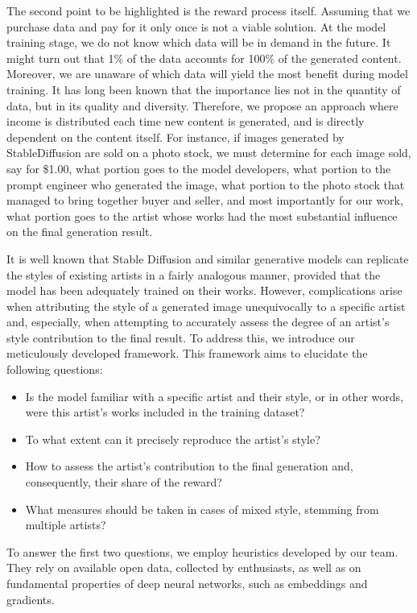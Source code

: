 \documentclass[12pt, letterpaper]{article}
\begin{document}
The second point to be highlighted is the reward process itself. Assuming that we purchase data and pay for it only once is not a viable solution. At the model training stage, we do not know which data will be in demand in the future. It might turn out that 1\% of the data accounts for 100\% of the generated content. Moreover, we are unaware of which data will yield the most benefit during model training. It has long been known that the importance lies not in the quantity of data, but in its quality and diversity. Therefore, we propose an approach where income is distributed each time new content is generated, and is directly dependent on the content itself. For instance, if images generated by StableDiffusion are sold on a photo stock, we must determine for each image sold, say for \$1.00, what portion goes to the model developers, what portion to the prompt engineer who generated the image, what portion to the photo stock that managed to bring together buyer and seller, and most importantly for our work, what portion goes to the artist whose works had the most substantial influence on the final generation result.

It is well known that Stable Diffusion and similar generative models can replicate the styles of existing artists in a fairly analogous manner, provided that the model has been adequately trained on their works. However, complications arise when attributing the style of a generated image unequivocally to a specific artist and, especially, when attempting to accurately assess the degree of an artist's style contribution to the final result. To address this, we introduce our meticulously developed framework. This framework aims to elucidate the following questions:

\begin{itemize}
    \item Is the model familiar with a specific artist and their style, or in other words, were this artist’s works included in the training dataset?
    \item To what extent can it precisely reproduce the artist's style?
    \item How to assess the artist's contribution to the final generation and, consequently, their share of the reward?
    \item What measures should be taken in cases of mixed style, stemming from multiple artists?
\end{itemize}

To answer the first two questions, we employ heuristics developed by our team. They rely on available open data, collected by enthusiasts, as well as on fundamental properties of deep neural networks, such as embeddings and gradients.
\end{document}
